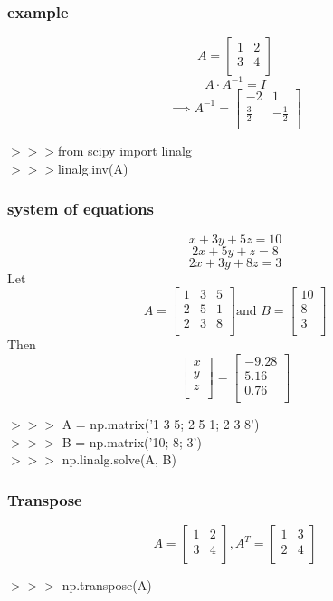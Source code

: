 \documentclass{beamer}
\begin{document}
\begin{frame}
\frametitle{example}
\[A=
\begin{bmatrix}
	1 & 2 \\
	3 & 4\\
\end{bmatrix}
\]
$$A\cdot A^{-1}=I$$
$$\implies A^{-1}=
\begin{bmatrix}
-2& 1\\
\frac 32 & -\frac 12 \\
\end{bmatrix}
$$
\begin{example}[code]
$>>>$from scipy import linalg\\
$>>>$linalg.inv(A)
\end{example}
\end{frame}
\begin{frame}
\frametitle{system of equations}
$$x+3y+5z=10$$
$$2x+5y+z=8$$
$$2x+3y+8z=3$$
Let 
$$A=
\begin{bmatrix}
1 & 3 &5\\
2 & 5 & 1\\
2 & 3 & 8\\
\end{bmatrix}
\text{and } B=
\begin{bmatrix}
10\\
8\\
3\\
\end{bmatrix}$$
Then $$
\begin{bmatrix}
x\\
y\\
z\\
\end{bmatrix}
=
\begin{bmatrix}
-9.28\\
5.16\\
0.76\\
\end{bmatrix}
$$
\end{frame}
\begin{frame}
\begin{example}[code]
$>>>$ A = np.matrix('1 3 5; 2 5 1; 2 3 8')\\
$>>>$ B = np.matrix('10; 8; 3')\\
$>>>$ np.linalg.solve(A, B)

\end{example}
\end{frame}

\begin{frame}
\frametitle{Transpose}
\[A=
\begin{bmatrix}
	1 & 2 \\
	3 & 4\\
\end{bmatrix}
,A^T=
\begin{bmatrix}
1 & 3\\
2 & 4\\
\end{bmatrix}
\]
\begin{example}[code]
$>>>$ np.transpose(A)
\end{example}
\end{frame}
\end{document}

